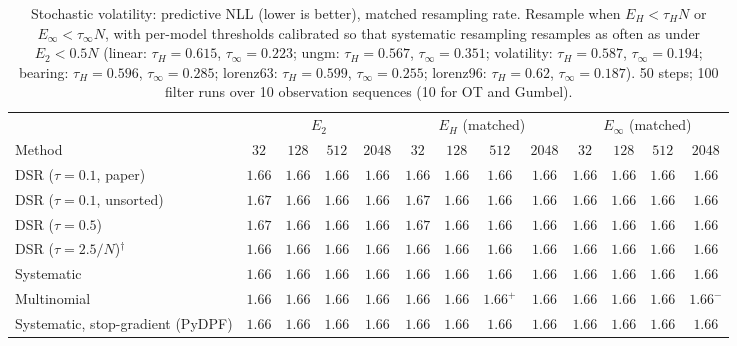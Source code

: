 \begin{table}[ht]
\centering
\small
\caption{Stochastic volatility: predictive NLL (lower is better), matched resampling rate. Resample when $E_H<\tau_HN$ or $E_\infty<\tau_\infty N$, with per-model thresholds calibrated so that systematic resampling resamples as often as under $E_2<0.5N$ (linear: $\tau_H{=}0.615$, $\tau_\infty{=}0.223$; ungm: $\tau_H{=}0.567$, $\tau_\infty{=}0.351$; volatility: $\tau_H{=}0.587$, $\tau_\infty{=}0.194$; bearing: $\tau_H{=}0.596$, $\tau_\infty{=}0.285$; lorenz63: $\tau_H{=}0.599$, $\tau_\infty{=}0.255$; lorenz96: $\tau_H{=}0.62$, $\tau_\infty{=}0.187$). 50 steps; 100 filter runs over 10 observation sequences (10 for OT and Gumbel).}
\label{tab:trigger-matched-volatility-predictive_nll}
\begin{adjustbox}{max width=\linewidth}
\begin{tabular}{lcccc|cccc|cccc}
\toprule
 & \multicolumn{4}{c}{$E_2$} & \multicolumn{4}{c}{$E_H$ (matched)} & \multicolumn{4}{c}{$E_\infty$ (matched)} \\
\cmidrule(lr){2-5} \cmidrule(lr){6-9} \cmidrule(lr){10-13}
Method & $32$ & $128$ & $512$ & $2048$ & $32$ & $128$ & $512$ & $2048$ & $32$ & $128$ & $512$ & $2048$ \\
\midrule
DSR ($\tau{=}0.1$, paper) & $1.66$ & $1.66$ & $1.66$ & $\mathbf{1.66}$ & $1.66$ & $1.66$ & $1.66$ & $1.66$ & $\mathbf{1.66}$ & $\mathbf{1.66}$ & $\mathbf{1.66}$ & $1.66$ \\
DSR ($\tau{=}0.1$, unsorted) & $1.67$ & $1.66$ & $\mathbf{1.66}$ & $\mathbf{1.66}$ & $1.67$ & $1.66$ & $1.66$ & $1.66$ & $\mathbf{1.66}$ & $\mathbf{1.66}$ & $1.66$ & $1.66$ \\
DSR ($\tau{=}0.5$) & $1.67$ & $1.66$ & $\mathbf{1.66}$ & $\mathbf{1.66}$ & $1.67$ & $1.66$ & $1.66$ & $1.66$ & $\mathbf{1.66}$ & $\mathbf{1.66}$ & $1.66$ & $1.66$ \\
DSR ($\tau{=}2.5/N$)$^\dagger$ & $1.66$ & $1.66$ & $1.66$ & $1.66$ & $1.66$ & $1.66$ & $\mathbf{1.66}$ & $\mathbf{1.66}$ & $\mathbf{1.66}$ & $\mathbf{1.66}$ & $1.66$ & $1.66$ \\
\midrule
Systematic & $\mathbf{1.66}$ & $1.66$ & $1.66$ & $\mathbf{1.66}$ & $1.66$ & $1.66$ & $\mathbf{1.66}$ & $1.66$ & $1.66$ & $\mathbf{1.66}$ & $1.66$ & $1.66$ \\
Multinomial & $1.66$ & $1.66$ & $1.66$ & $\mathbf{1.66}$ & $\mathbf{1.66}$ & $1.66$ & $\mathbf{1.66}^{+}$ & $1.66$ & $1.66$ & $\mathbf{1.66}$ & $1.66$ & $1.66^{-}$ \\
Systematic, stop-gradient (PyDPF) & $\mathbf{1.66}$ & $1.66$ & $1.66$ & $\mathbf{1.66}$ & $1.66$ & $1.66$ & $\mathbf{1.66}$ & $1.66$ & $1.66$ & $\mathbf{1.66}$ & $1.66$ & $1.66$ \\

\end{tabular}
\end{adjustbox}
\end{table}
